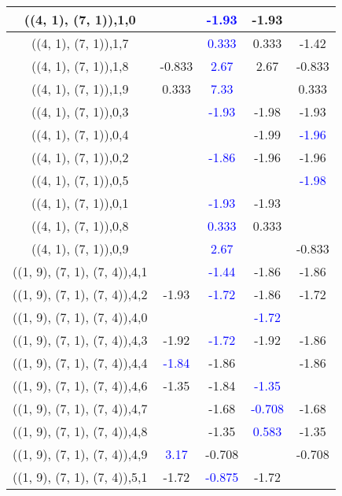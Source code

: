 \documentclass{article}
\begin{document}
\begin{center}
\begin{longtable}{|c|c|c|c|c|}
        	\hline
        	((4, 1), (7, 1)),1,0&& \textcolor{blue}{-1.93}&-1.93&\\
        	\hline
        	((4, 1), (7, 1)),1,7&& \textcolor{blue}{0.333}&0.333&-1.42\\
        	\hline
        	((4, 1), (7, 1)),1,8&-0.833& \textcolor{blue}{2.67}&2.67&-0.833\\
        	\hline
        	((4, 1), (7, 1)),1,9&0.333& \textcolor{blue}{7.33}&&0.333\\
        	\hline
        	((4, 1), (7, 1)),0,3&& \textcolor{blue}{-1.93}&-1.98&-1.93\\
        	\hline
        	((4, 1), (7, 1)),0,4&&&-1.99& \textcolor{blue}{-1.96}\\
        	\hline
        	((4, 1), (7, 1)),0,2&& \textcolor{blue}{-1.86}&-1.96&-1.96\\
        	\hline
        	((4, 1), (7, 1)),0,5&&&& \textcolor{blue}{-1.98}\\
        	\hline
        	((4, 1), (7, 1)),0,1&& \textcolor{blue}{-1.93}&-1.93&\\
        	\hline
        	((4, 1), (7, 1)),0,8&& \textcolor{blue}{0.333}&0.333&\\
        	\hline
        	((4, 1), (7, 1)),0,9&& \textcolor{blue}{2.67}&&-0.833\\
        	\hline
        	((1, 9), (7, 1), (7, 4)),4,1&& \textcolor{blue}{-1.44}&-1.86&-1.86\\
        	\hline
        	((1, 9), (7, 1), (7, 4)),4,2&-1.93& \textcolor{blue}{-1.72}&-1.86&-1.72\\
        	\hline
        	((1, 9), (7, 1), (7, 4)),4,0&&& \textcolor{blue}{-1.72}&\\
        	\hline
        	((1, 9), (7, 1), (7, 4)),4,3&-1.92& \textcolor{blue}{-1.72}&-1.92&-1.86\\
        	\hline
        	((1, 9), (7, 1), (7, 4)),4,4& \textcolor{blue}{-1.84}&-1.86&&-1.86\\
        	\hline
        	((1, 9), (7, 1), (7, 4)),4,6&-1.35&-1.84& \textcolor{blue}{-1.35}&\\
        	\hline
        	((1, 9), (7, 1), (7, 4)),4,7&&-1.68& \textcolor{blue}{-0.708}&-1.68\\
        	\hline
        	((1, 9), (7, 1), (7, 4)),4,8&&-1.35& \textcolor{blue}{0.583}&-1.35\\
        	\hline
        	((1, 9), (7, 1), (7, 4)),4,9& \textcolor{blue}{3.17}&-0.708&&-0.708\\
        	\hline
        	((1, 9), (7, 1), (7, 4)),5,1&-1.72& \textcolor{blue}{-0.875}&-1.72&\\

\end{longtable}
\end{center}
\end{document}
